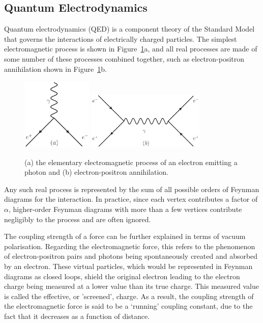 \subsection{Quantum Electrodynamics}
\label{ss:quantum_electrodynamics}

Quantum electrodynamics (QED) is a component theory of the Standard Model that governs the interactions of
electrically charged particles. The simplest electromagnetic process is shown in
Figure~\ref{fig:qed_processes}a, and all real processes are made of some number of these processes combined
together, such as electron-positron annihilation shown in Figure~\ref{fig:qed_processes}b.

\begin{figure}[hbtp]
   \centering
     \includegraphics[width=0.3\textwidth]{Chapters/02_Theory/Images/e_e_gamma}\hfill
     \includegraphics[width=0.5\textwidth]{Chapters/02_Theory/Images/e_e_gamma_e_e}
     \caption[Elementary electromagnetic processes.]{(a) the elementary electromagnetic process of an electron
     emitting a photon and (b) electron-positron annihilation.}
     \label{fig:qed_processes}
\end{figure}

Any such real process is represented by the sum of all possible orders of Feynman diagrams for the
interaction. In practice, since each vertex contributes a factor of $\alpha$, higher-order Feynman diagrams
with more than a few vertices contribute negligibly to the process and are often ignored.

The coupling strength of a force can be further explained in terms of vacuum polarisation. Regarding the
electromagnetic force, this refers to the phenomenon of electron-positron pairs and photons being
spontaneously created and absorbed by an electron. These virtual particles, which would be represented in
Feynman diagrams as closed loops, shield the original electron leading to the electron charge being measured
at a lower value than its true charge. This measured value is called the effective, or 'screened', charge. As
a result, the coupling strength of the electromagnetic force is said to be a `running' coupling
constant, due to the fact that it decreases as a function of distance.

